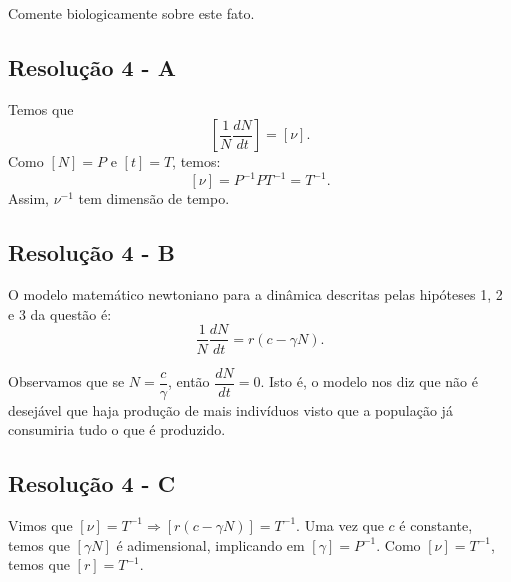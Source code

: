 Comente biologicamente sobre este fato.


\clearpage

\subsection*{\blue Resolução 4 - \textbf{A}}


Temos que
\[\left[\dfrac{1}{N}\dfrac{dN}{dt}\right] = [\nu].\]
Como \([N] =P\) e \([t] = T\), temos:
\[[\nu] = P^{-1} P T^{-1} = T^{-1}.\]
Assim, \(\nu^{-1}\) tem dimensão de tempo.






\subsection*{\blue Resolução 4 - \textbf{B}}

O modelo matemático newtoniano para a dinâmica descritas pelas hipóteses 1, 2 e 3 da questão é:
\[\dfrac{1}{N} \dfrac{dN}{dt} = r (c-\gamma N).\]


Observamos que se \(N = \dfrac{c}{\gamma}\), então \(\dfrac{dN}{dt} = 0\). Isto é, o modelo nos diz que não é desejável que haja produção de mais indivíduos visto que a população já consumiria tudo o que é produzido.




\subsection*{\blue Resolução 4 - \textbf{C}}

Vimos que \([\nu] = T^{-1} \Rightarrow [r(c-\gamma N)] = T^{-1}\). Uma vez que \(c\) é constante, temos que \([\gamma N]\) é adimensional, implicando em \([\gamma] = P^{-1}\). Como \([\nu] = T^{-1}\), temos que \([r] = T^{-1}\).


